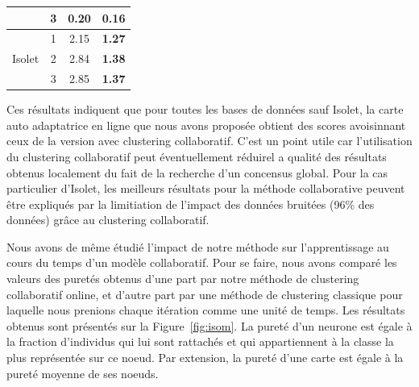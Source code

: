 \documentclass[a4paper]{article}
\begin{document}
\begin{table}[!h]
\begin{center}
\begin{tabular}{cccc}
                           & 3    & 0.20            & \textbf{0.16}                                                                  \\ \midrule
\multirow{3}{*}{Isolet}    & 1    & 2.15            & \textbf{1.27}                                                                  \\
                           & 2    & 2.84            & \textbf{1.38}                                                                  \\
                           & 3    & 2.85            & \textbf{1.37}                                                                 \\ \midrule
\end{tabular}
		\end{center}
\label{tab:tab1}
	\end{table}

    Ces résultats indiquent que pour toutes les bases de données sauf Isolet, la carte auto adaptatrice en ligne que nous avons proposée obtient des scores avoisinnant ceux de la version avec clustering collaboratif. C'est un point utile car l'utilisation du clustering collaboratif peut éventuellement réduirel a qualité des résultats obtenus localement du fait de la recherche d'un concensus global. Pour la cas particulier d'Isolet, les meilleurs résultats pour la méthode collaborative peuvent être expliqués par la limitiation de l'impact des données bruitées (96\% des données) grâce au clustering collaboratif.

    Nous avons de même étudié l'impact de notre méthode sur l'apprentissage au cours du temps d'un modèle collaboratif. Pour se faire, nous avons comparé les valeurs des puretés obtenus d'une part par notre méthode de clustering collaboratif online, et d'autre part par une méthode de clustering classique pour laquelle nous prenions chaque itération comme une unité de temps. Les résultats obtenus sont présentés sur la Figure~\ref{fig:isom}. La pureté d'un neurone est égale à la fraction d'individus qui lui sont rattachés et qui appartiennent à la classe la plus représentée sur ce noeud. Par extension, la pureté d'une carte est égale à la pureté moyenne de ses noeuds.
\end{document}
